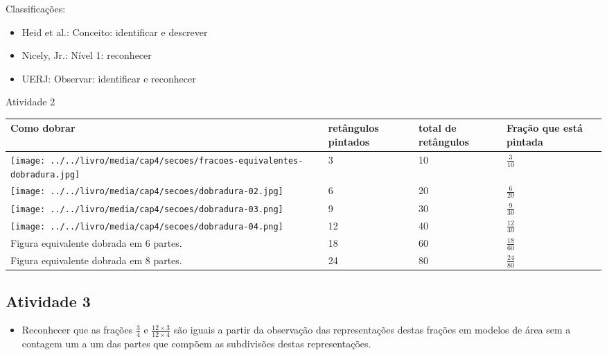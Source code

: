 \documentclass[oneside]{book}
\begin{document}
\begin{multicols}{2}
  
  Classificações:  
\begin{itemize} %
    \item       Heid et al.: Conceito: identificar e descrever
    \item       Nicely, Jr.: Nível 1: reconhecer
    \item       UERJ: Observar: identificar e reconhecer
\end{itemize} %
  
\begin{resposta*}{Atividade 2}
  
\noindent 
\begin{tabular}{|m{}|m{}|m{}|m{
}|}
    \hline
      Como dobrar  &  retângulos pintados  & total de retângulos  &  Fração que 
está pintada  \\
    \hline \hline   
       \texttt{[image: 
../../livro/media/cap4/secoes/fracoes-equivalentes-dobradura.jpg]} &  3 &  10 &  
$\frac{3}{10}$ \\
      \hline 
       \texttt{[image: ../../livro/media/cap4/secoes/dobradura-02.jpg]} &  6 &  20 &  
$\frac{6}{20}$ \\
      \hline 
       \texttt{[image: ../../livro/media/cap4/secoes/dobradura-03.png]} &  9 &  30 &  
$\frac{9}{30}$ \\
      \hline 
       \texttt{[image: ../../livro/media/cap4/secoes/dobradura-04.png]} &  12 &  40 &  
$\frac{12}{40}$ \\
      \hline 
       Figura equivalente dobrada em 6 partes.&  18 &  60 &  $\frac{18}{60}$ \\
      \hline 
       Figura equivalente dobrada em 8 partes.&  24 &  80 &  $\frac{24}{80}$ \\
      \hline 
    \end{tabular}
  
\end{resposta*}


\subsection{Atividade 3}


\begin{itemize} %
    \item       Reconhecer que as frações       $\frac{3}{4}$       e       
$\frac{12 \times 3}{12 \times 4}$       são iguais a partir da observação das 
representações destas frações em modelos de área sem a contagem um a um das 
partes que compõem as subdivisões destas representações.
\end{itemize} %
  

\end{multicols}
\end{document}
